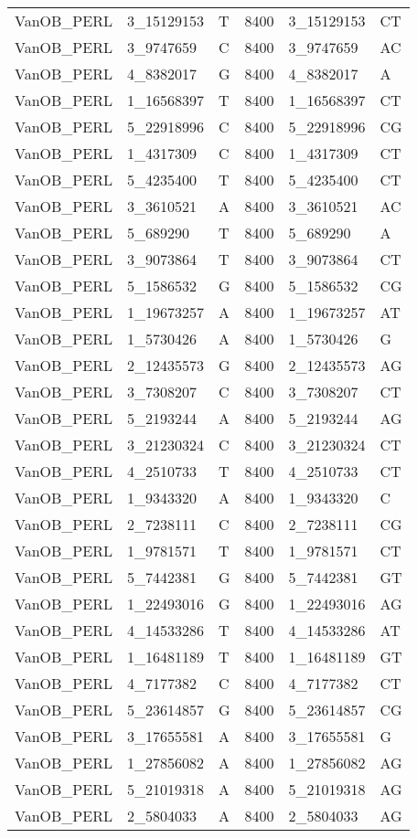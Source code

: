 \begin{center}
\begin{longtable}{|l|l|l|l|l|l|}
VanOB\_PERL&3\_15129153&T&8400&3\_15129153&CT\\
VanOB\_PERL&3\_9747659&C&8400&3\_9747659&AC\\
VanOB\_PERL&4\_8382017&G&8400&4\_8382017&A\\
VanOB\_PERL&1\_16568397&T&8400&1\_16568397&CT\\
VanOB\_PERL&5\_22918996&C&8400&5\_22918996&CG\\
VanOB\_PERL&1\_4317309&C&8400&1\_4317309&CT\\
VanOB\_PERL&5\_4235400&T&8400&5\_4235400&CT\\
VanOB\_PERL&3\_3610521&A&8400&3\_3610521&AC\\
VanOB\_PERL&5\_689290&T&8400&5\_689290&A\\
VanOB\_PERL&3\_9073864&T&8400&3\_9073864&CT\\
VanOB\_PERL&5\_1586532&G&8400&5\_1586532&CG\\
VanOB\_PERL&1\_19673257&A&8400&1\_19673257&AT\\
VanOB\_PERL&1\_5730426&A&8400&1\_5730426&G\\
VanOB\_PERL&2\_12435573&G&8400&2\_12435573&AG\\
VanOB\_PERL&3\_7308207&C&8400&3\_7308207&CT\\
VanOB\_PERL&5\_2193244&A&8400&5\_2193244&AG\\
VanOB\_PERL&3\_21230324&C&8400&3\_21230324&CT\\
VanOB\_PERL&4\_2510733&T&8400&4\_2510733&CT\\
VanOB\_PERL&1\_9343320&A&8400&1\_9343320&C\\
VanOB\_PERL&2\_7238111&C&8400&2\_7238111&CG\\
VanOB\_PERL&1\_9781571&T&8400&1\_9781571&CT\\
VanOB\_PERL&5\_7442381&G&8400&5\_7442381&GT\\
VanOB\_PERL&1\_22493016&G&8400&1\_22493016&AG\\
VanOB\_PERL&4\_14533286&T&8400&4\_14533286&AT\\
VanOB\_PERL&1\_16481189&T&8400&1\_16481189&GT\\
VanOB\_PERL&4\_7177382&C&8400&4\_7177382&CT\\
VanOB\_PERL&5\_23614857&G&8400&5\_23614857&CG\\
VanOB\_PERL&3\_17655581&A&8400&3\_17655581&G\\
VanOB\_PERL&1\_27856082&A&8400&1\_27856082&AG\\
VanOB\_PERL&5\_21019318&A&8400&5\_21019318&AG\\
VanOB\_PERL&2\_5804033&A&8400&2\_5804033&AG\\

\end{longtable}
\end{center}

